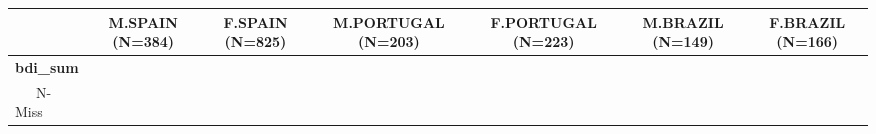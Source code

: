 \documentclass[
]{book}
\begin{document}
\begin{longtable}[]{@{}lcccccc@{}}
\toprule
\begin{minipage}[b]{0.16\columnwidth}\raggedright
\strut
\end{minipage} & \begin{minipage}[b]{0.10\columnwidth}\centering
M.SPAIN (N=384)\strut
\end{minipage} & \begin{minipage}[b]{0.10\columnwidth}\centering
F.SPAIN (N=825)\strut
\end{minipage} & \begin{minipage}[b]{0.12\columnwidth}\centering
M.PORTUGAL (N=203)\strut
\end{minipage} & \begin{minipage}[b]{0.12\columnwidth}\centering
F.PORTUGAL (N=223)\strut
\end{minipage} & \begin{minipage}[b]{0.11\columnwidth}\centering
M.BRAZIL (N=149)\strut
\end{minipage} & \begin{minipage}[b]{0.11\columnwidth}\centering
F.BRAZIL (N=166)\strut
\end{minipage}\tabularnewline
\midrule
\endhead
\begin{minipage}[t]{0.16\columnwidth}\raggedright
\textbf{bdi\_sum}\strut
\end{minipage} & \begin{minipage}[t]{0.10\columnwidth}\centering
\strut
\end{minipage} & \begin{minipage}[t]{0.10\columnwidth}\centering
\strut
\end{minipage} & \begin{minipage}[t]{0.12\columnwidth}\centering
\strut
\end{minipage} & \begin{minipage}[t]{0.12\columnwidth}\centering
\strut
\end{minipage} & \begin{minipage}[t]{0.11\columnwidth}\centering
\strut
\end{minipage} & \begin{minipage}[t]{0.11\columnwidth}\centering
\strut
\end{minipage}\tabularnewline
\begin{minipage}[t]{0.16\columnwidth}\raggedright
~~~N-Miss\strut
\end{minipage} & \begin{minipage}[t]{0.10\columnwidth}\centering

\end{minipage}
\end{longtable}
\end{document}
